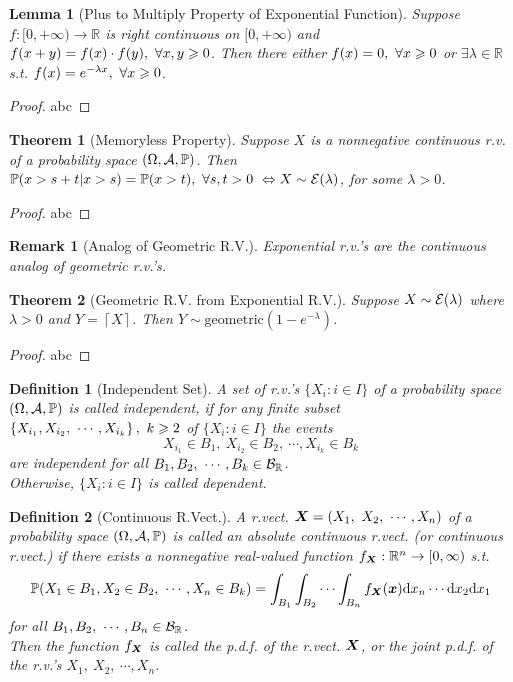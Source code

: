 \documentclass[openany,12pt]{book}
\newtheorem{theorem}{Theorem}[chapter]
\newtheorem{remark}{Remark}[chapter]
\newtheorem{lemma}{Lemma}[chapter]
\newtheorem{definition}{Definition}[chapter]
\begin{document}
\begin{lemma}[Plus to Multiply Property of Exponential Function]
Suppose $f:[0,+\infty)\to\mathbb{R}$ is right continuous on $[0,+\infty)$ and $f(x+y)=f(x)\cdot f(y),\ \forall x,y\geqslant0$. Then there either $f(x)=0,\ \forall x\gs0$ or $\exists\lambda\in\mathbb{R}$ s.t. $f(x)=e^{-\lambda x},\ \forall x\geqslant0$.
\end{lemma}

\begin{proof}
  abc
\end{proof}

\begin{theorem}[Memoryless Property]
Suppose $X$ is a nonnegative continuous r.v. of a probability space $(\Omega,\mathcal{A},\mathbb{P})$. Then $\mathbb{P}(x>s+t| x>s)=\mathbb{P}(x>t),\ \forall s,t>0\ \Leftrightarrow X\sim\me(\lambda)$, for some $\lambda>0$.
\end{theorem}

\begin{proof}
  abc
\end{proof}

\begin{remark}[Analog of Geometric R.V.]
Exponential r.v.'s are the continuous analog of geometric r.v.'s.
\end{remark}

\begin{theorem}[Geometric R.V. from Exponential R.V.]
Suppose $X\sim\mathcal{E}(\lambda)$ where $\lambda>0$ and $Y=\left\lceil X\right\rceil$. Then $Y\sim\mathrm{geometric}\left(1-e^{-\lambda}\right)$.
\end{theorem}

\begin{proof}
  abc
\end{proof}

\begin{definition}[Independent Set]
A set of r.v.'s $\{X_i:i\in I\}$ of a probability space $(\Omega,\mathcal{A},\mathbb{P})$ is called independent, if for any finite subset $\left\{X_{i_1},X_{i_2},\ \cdots,X_{i_k}\right\},\ k\gs2$ of $\{X_i:i\in I\}$ the events
$$
X_{i_1}\in B_1,\ X_{i_2}\in B_2,\ \cdots,X_{i_k}\in B_k
$$
are independent for all $B_1,B_2,\ \cdots,B_k\in\mb_\mathbb{R}$.\\
Otherwise, $\{X_i:i\in I\}$ is called dependent.
\end{definition}

\begin{definition}[Continuous R.Vect.]
A r.vect. $\bm{X}=(X_1,\ X_2,\ \cdots,X_n)$ of a probability space $(\Omega,\mathcal{A},\mathbb{P})$ is called an absolute continuous r.vect. (or continuous r.vect.) if there exists a nonnegative real-valued function $f_{\bm{X}}:\mathbb{R}^n\to[0,\infty)$ s.t.
$$
\mathbb{P}(X_1\in B_1,X_2\in B_2,\ \cdots,X_n\in B_k)=\int_{B_1}\int_{B_2}{\cdots\int_{B_n}{f_{\mX}(\mx)\dif x_n}}\cdots \dif x_2\dif x_1
$$
for all $B_1,B_2,\ \cdots,B_n\in\mb_\mathbb{R}$.\\
Then the function $f_{\bm{X}}$ is called the p.d.f. of the r.vect. $\bm{X}$, or the joint p.d.f. of the r.v.'s $X_1,\ X_2,\ \cdots,X_n$.
\end{definition}
\end{document}

